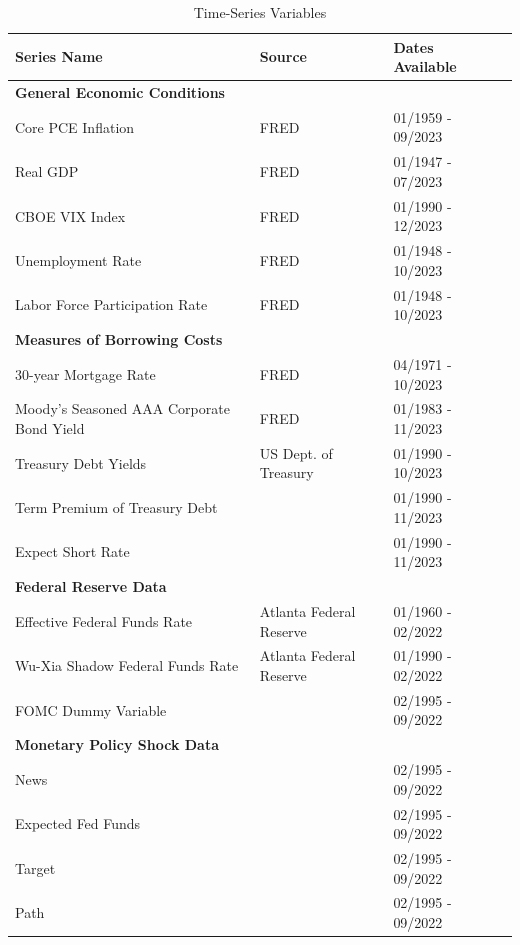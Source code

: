 \documentclass[12pt,final]{article}
\begin{document}
\begin{table}[h!]
\caption{Time-Series Variables}
\noindent \begin{tabular}{|| l | l | l | l ||}
	\hline
	Series Name & Source & Dates Available \\
	\hline
	\textbf{General Economic Conditions} & & \\
	Core PCE Inflation & FRED & 01/1959 - 09/2023 \\ 
	Real GDP & FRED & 01/1947 - 07/2023 \\
	CBOE VIX Index & FRED & 01/1990 - 12/2023 \\
	Unemployment Rate & FRED & 01/1948 - 10/2023 \\
	Labor Force Participation Rate & FRED & 01/1948 - 10/2023 \\
	\textbf{Measures of Borrowing Costs} & & \\ 
	30-year Mortgage Rate & FRED & 04/1971 - 10/2023 \\ 
	Moody's Seasoned AAA Corporate Bond Yield & FRED & 01/1983 - 11/2023 \\ 
	Treasury Debt Yields & US Dept. of Treasury & 01/1990 - 10/2023 \\
	Term Premium of Treasury Debt & \citep{Kim2005} & 01/1990 - 11/2023 \\ 
	Expect Short Rate & \citep{Kim2005} & 01/1990 - 11/2023 \\
	\textbf{Federal Reserve Data} & & \\
	Effective Federal Funds Rate & Atlanta Federal Reserve & 01/1960 - 02/2022 \\ 
	Wu-Xia Shadow Federal Funds Rate & Atlanta Federal Reserve & 01/1990 - 02/2022 \\ 
	FOMC Dummy Variable & \citep{Acosta2022} & 02/1995 - 09/2022 \\ 
	\textbf{Monetary Policy Shock Data} & & \\
	News & \citep{Acosta2022} &  02/1995 - 09/2022 \\
	Expected Fed Funds & \citep{Acosta2022} & 02/1995 - 09/2022 \\ 
	Target & \citep{Acosta2022} & 02/1995 - 09/2022 \\
	Path & \citep{Acosta2022} & 02/1995 - 09/2022 \\ 
	\hline
\end{tabular}
\label{table:1}
\end{table}
\end{document}
